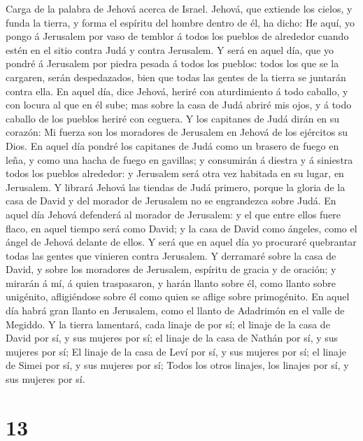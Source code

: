  Carga de la palabra de Jehová acerca de Israel. Jehová,
que extiende los cielos, y funda la tierra, y forma el espíritu del
hombre dentro de él, ha dicho:  He aquí, yo pongo á
Jerusalem por vaso de temblor á todos los pueblos de alrededor cuando
estén en el sitio contra Judá y contra Jerusalem.  Y será
en aquel día, que yo pondré á Jerusalem por piedra pesada á todos los
pueblos: todos los que se la cargaren, serán despedazados, bien que
todas las gentes de la tierra se juntarán contra ella.  En
aquel día, dice Jehová, heriré con aturdimiento á todo caballo, y con
locura al que en él sube; mas sobre la casa de Judá abriré mis ojos, y á
todo caballo de los pueblos heriré con ceguera.  Y los
capitanes de Judá dirán en su corazón: Mi fuerza son los moradores de
Jerusalem en Jehová de los ejércitos su Dios.  En aquel
día pondré los capitanes de Judá como un brasero de fuego en leña, y
como una hacha de fuego en gavillas; y consumirán á diestra y á
siniestra todos los pueblos alrededor: y Jerusalem será otra vez
habitada en su lugar, en Jerusalem.  Y librará Jehová las
tiendas de Judá primero, porque la gloria de la casa de David y del
morador de Jerusalem no se engrandezca sobre Judá.  En
aquel día Jehová defenderá al morador de Jerusalem: y el que entre ellos
fuere flaco, en aquel tiempo será como David; y la casa de David como
ángeles, como el ángel de Jehová delante de ellos.  Y será
que en aquel día yo procuraré quebrantar todas las gentes que vinieren
contra Jerusalem.  Y derramaré sobre la casa de David, y
sobre los moradores de Jerusalem, espíritu de gracia y de oración; y
mirarán á mí, á quien traspasaron, y harán llanto sobre él, como llanto
sobre unigénito, afligiéndose sobre él como quien se aflige sobre
primogénito.  En aquel día habrá gran llanto en
Jerusalem, como el llanto de Adadrimón en el valle de Megiddo.
 Y la tierra lamentará, cada linaje de por sí; el linaje
de la casa de David por sí, y sus mujeres por sí; el linaje de la casa
de Nathán por sí, y sus mujeres por sí;  El linaje de la
casa de Leví por sí, y sus mujeres por sí; el linaje de Simei por sí, y
sus mujeres por sí;  Todos los otros linajes, los linajes
por sí, y sus mujeres por sí.

\hypertarget{section-12}{%
\section{13}\label{section-12}}

